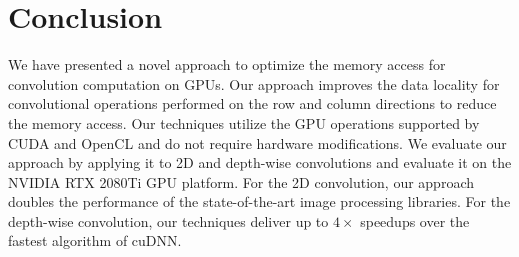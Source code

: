 \section{Conclusion}
We have presented a novel approach to optimize the memory access for convolution computation on GPUs. Our approach improves the data
locality for convolutional operations performed on the row and column directions to reduce the memory access. Our techniques utilize the
GPU operations supported by CUDA and OpenCL and do not require hardware modifications. We evaluate our approach by applying it to 2D and depth-wise
convolutions and evaluate it on the NVIDIA RTX 2080Ti GPU platform. For the 2D convolution, our approach doubles the performance of the
state-of-the-art image processing libraries. For the depth-wise convolution, our techniques deliver up to $4 \times$ speedups over the fastest algorithm
of cuDNN.



